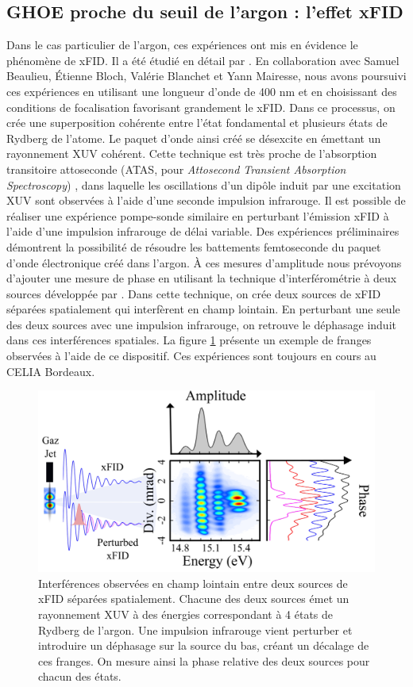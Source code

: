 \subsection{GHOE proche du seuil de l'argon : l'effet xFID}
Dans le cas particulier de l'argon, ces expériences ont mis en évidence le phénomène de xFID. Il a été étudié en détail par . En collaboration avec Samuel Beaulieu, \'{E}tienne Bloch, Valérie Blanchet et Yann Mairesse, nous avons poursuivi ces expériences en utilisant une longueur d'onde de 400 nm et en choisissant des conditions de focalisation favorisant grandement le xFID. Dans ce processus, on crée une superposition cohérente entre l'état fondamental et plusieurs états de Rydberg de l'atome. Le paquet d'onde ainsi créé se désexcite en émettant un rayonnement XUV cohérent. Cette technique est très proche de l'absorption transitoire attoseconde (ATAS, pour \textit{Attosecond Transient Absorption Spectroscopy}) , dans laquelle les oscillations d'un dipôle induit par une excitation XUV sont observées à l'aide d'une seconde impulsion infrarouge. Il est possible de réaliser une expérience pompe-sonde similaire en perturbant l'émission xFID à l'aide d'une impulsion infrarouge de délai variable. Des expériences préliminaires démontrent la possibilité de résoudre les battements femtoseconde du paquet d'onde électronique créé dans l'argon. \`A ces mesures d'amplitude nous prévoyons d'ajouter une mesure de phase en utilisant la technique d'interférométrie à deux sources développée par . Dans cette technique, on crée deux sources de xFID séparées spatialement qui interfèrent en champ lointain. En perturbant une seule des deux sources avec une impulsion infrarouge, on retrouve le déphasage induit dans ces interférences spatiales. La figure \ref{fig:xfid_deuxsources} présente un exemple de franges observées à l'aide de ce dispositif. Ces expériences sont toujours en cours au CELIA Bordeaux. 

\begin{figure}[!ht]
\centering
\includegraphics[width=.8\columnwidth]{Figures/Conclusion/xfid_deuxsources.png}%
\caption{Interférences observées en champ lointain entre deux sources de xFID séparées spatialement. Chacune des deux sources émet un rayonnement XUV à des énergies correspondant à 4 états de Rydberg de l'argon. Une impulsion infrarouge vient perturber et introduire un déphasage sur la source du bas, créant un décalage de ces franges. On mesure ainsi la phase relative des deux sources pour chacun des états.}
\label{fig:xfid_deuxsources}
\end{figure}

